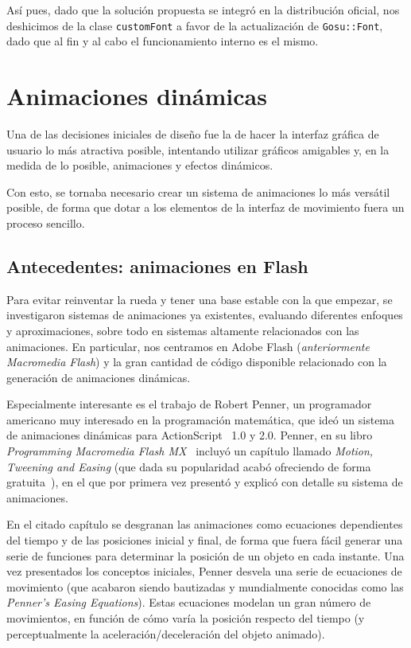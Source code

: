 Así pues, dado que la solución propuesta se integró en la distribución oficial,
nos deshicimos de la clase \texttt{customFont} a favor de la actualización de
\texttt{Gosu::Font}, dado que al fin y al cabo el funcionamiento interno es
el mismo.

\section{Animaciones dinámicas}
\label{sec:animaciones}

Una de las decisiones iniciales de diseño fue la de hacer la interfaz gráfica de
usuario lo más atractiva posible, intentando utilizar gráficos amigables y, en
la medida de lo posible, animaciones y efectos dinámicos.

Con esto, se tornaba necesario crear un sistema de animaciones lo más versátil
posible, de forma que dotar a los elementos de la interfaz de movimiento fuera
un proceso sencillo. 

\subsection{Antecedentes: animaciones en Flash}
Para evitar reinventar la rueda y tener una base estable con la que empezar, se
investigaron sistemas de animaciones ya existentes, evaluando diferentes
enfoques y aproximaciones, sobre todo en sistemas altamente relacionados con las
animaciones. En particular, nos centramos en Adobe Flash (\textit{anteriormente
  Macromedia Flash}) y la gran cantidad de código disponible relacionado con la
generación de animaciones dinámicas.

Especialmente interesante es el trabajo de Robert Penner, un programador
americano muy interesado en la programación matemática, que ideó un sistema de
animaciones dinámicas para ActionScript~\cite{actionscript} 1.0 y 2.0. Penner,
en su libro \textit{Programming Macromedia Flash MX}~\cite{libropenner} incluyó
un capítulo llamado \textit{Motion, Tweening and Easing} (que dada su
popularidad acabó ofreciendo de forma gratuita~\cite{capitulopenner}), en el que
por primera vez presentó y explicó con detalle su sistema de animaciones.

En el citado capítulo se desgranan las animaciones como ecuaciones dependientes
del tiempo y de las posiciones inicial y final, de forma que fuera fácil generar
una serie de funciones para determinar la posición de un objeto en cada
instante. Una vez presentados los conceptos iniciales, Penner desvela una serie
de ecuaciones de movimiento (que acabaron siendo bautizadas y mundialmente
conocidas como las \textit{Penner's Easing Equations}). Estas ecuaciones modelan
un gran número de movimientos, en función de cómo varía la posición respecto del
tiempo (y perceptualmente la aceleración/deceleración del objeto animado).

